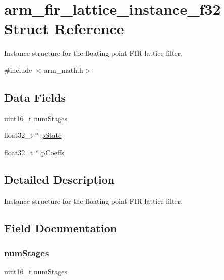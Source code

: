 \hypertarget{structarm__fir__lattice__instance__f32}{}\section{arm\+\_\+fir\+\_\+lattice\+\_\+instance\+\_\+f32 Struct Reference}
\label{structarm__fir__lattice__instance__f32}


Instance structure for the floating-\/point F\+IR lattice filter.  




{\ttfamily \#include $<$arm\+\_\+math.\+h$>$}

\subsection*{Data Fields}
\begin{DoxyCompactItemize}
\item 
uint16\+\_\+t \hyperlink{structarm__fir__lattice__instance__f32_a4cceb90547b3e585d4c7aabaa8057212}{num\+Stages}
\item 
float32\+\_\+t $\ast$ \hyperlink{structarm__fir__lattice__instance__f32_a335c87e6fdc4b96601d95a5de8b9c463}{p\+State}
\item 
float32\+\_\+t $\ast$ \hyperlink{structarm__fir__lattice__instance__f32_aacbb8dd8eeba4b21fc2bb40076405ee3}{p\+Coeffs}
\end{DoxyCompactItemize}


\subsection{Detailed Description}
Instance structure for the floating-\/point F\+IR lattice filter. 

\subsection{Field Documentation}
\mbox{\label{structarm__fir__lattice__instance__f32_a4cceb90547b3e585d4c7aabaa8057212}} 
\subsubsection{\texorpdfstring{num\+Stages}{numStages}}
{\footnotesize\ttfamily uint16\+\_\+t num\+Stages}


